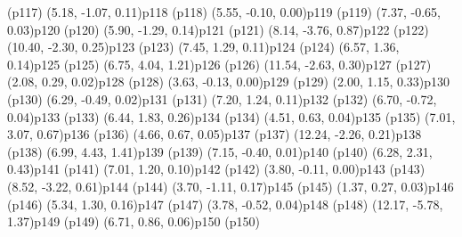 \psdot(p117)
\psPoint(5.18, -1.07, 0.11){p118}
\psdot(p118)
\psPoint(5.55, -0.10, 0.00){p119}
\psdot(p119)
\psPoint(7.37, -0.65, 0.03){p120}
\psdot(p120)
\psPoint(5.90, -1.29, 0.14){p121}
\psdot(p121)
\psPoint(8.14, -3.76, 0.87){p122}
\psdot(p122)
\psPoint(10.40, -2.30, 0.25){p123}
\psdot(p123)
\psPoint(7.45, 1.29, 0.11){p124}
\psdot(p124)
\psPoint(6.57, 1.36, 0.14){p125}
\psdot(p125)
\psPoint(6.75, 4.04, 1.21){p126}
\psdot(p126)
\psPoint(11.54, -2.63, 0.30){p127}
\psdot(p127)
\psPoint(2.08, 0.29, 0.02){p128}
\psdot(p128)
\psPoint(3.63, -0.13, 0.00){p129}
\psdot(p129)
\psPoint(2.00, 1.15, 0.33){p130}
\psdot(p130)
\psPoint(6.29, -0.49, 0.02){p131}
\psdot(p131)
\psPoint(7.20, 1.24, 0.11){p132}
\psdot(p132)
\psPoint(6.70, -0.72, 0.04){p133}
\psdot(p133)
\psPoint(6.44, 1.83, 0.26){p134}
\psdot(p134)
\psPoint(4.51, 0.63, 0.04){p135}
\psdot(p135)
\psPoint(7.01, 3.07, 0.67){p136}
\psdot(p136)
\psPoint(4.66, 0.67, 0.05){p137}
\psdot(p137)
\psPoint(12.24, -2.26, 0.21){p138}
\psdot(p138)
\psPoint(6.99, 4.43, 1.41){p139}
\psdot(p139)
\psPoint(7.15, -0.40, 0.01){p140}
\psdot(p140)
\psPoint(6.28, 2.31, 0.43){p141}
\psdot(p141)
\psPoint(7.01, 1.20, 0.10){p142}
\psdot(p142)
\psPoint(3.80, -0.11, 0.00){p143}
\psdot(p143)
\psPoint(8.52, -3.22, 0.61){p144}
\psdot(p144)
\psPoint(3.70, -1.11, 0.17){p145}
\psdot(p145)
\psPoint(1.37, 0.27, 0.03){p146}
\psdot(p146)
\psPoint(5.34, 1.30, 0.16){p147}
\psdot(p147)
\psPoint(3.78, -0.52, 0.04){p148}
\psdot(p148)
\psPoint(12.17, -5.78, 1.37){p149}
\psdot(p149)
\psPoint(6.71, 0.86, 0.06){p150}
\psdot(p150)
